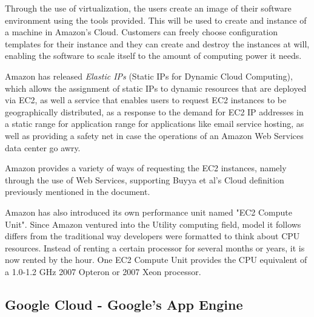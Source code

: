 Through the use of virtualization, the users create an image of their software environment using the tools provided. This will be used to create and instance of a machine in Amazon's Cloud. Customers can freely choose configuration templates for their instance and they can create and destroy the instances at will, enabling the software to scale itself to the amount of computing power it needs.\cite{grids-and-clouds, hazel}

Amazon has released \textit{Elastic IPs} (Static IPs for Dynamic Cloud Computing), which allows the assignment of static IPs to dynamic resources that are deployed via EC2, as well a service that enables users to request EC2 instances to be geographically distributed, as a response to the demand for EC2 IP addresses in a static range for application range for applications like email service hosting, as well as providing a safety net in case the operations of an Amazon Web Services data center go awry. 

Amazon provides a variety of ways of requesting the EC2 instances, namely through the use of Web Services, supporting Buyya et al's Cloud definition previously mentioned in the document.

Amazon has also introduced its own performance unit named "EC2 Compute Unit". Since Amazon ventured into the Utility computing field, model it follows differs from the traditional way developers were formatted to think about CPU resources. Instead of renting a certain processor for several months or years, it is now rented by the hour. One EC2 Compute Unit provides the CPU equivalent of a 1.0-1.2 GHz 2007 Opteron or 2007 Xeon processor.\cite{amazon-aws}

\subsection{Google Cloud - Google's App Engine}\label{googleapps}


